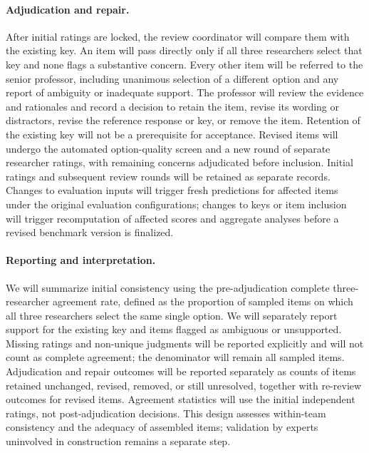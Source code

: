 \documentclass[11pt]{article}
\begin{document}
\paragraph{Adjudication and repair.}
After initial ratings are locked, the review coordinator will compare them with the existing key. An item will pass directly only if all three researchers select that key and none flags a substantive concern. Every other item will be referred to the senior professor, including unanimous selection of a different option and any report of ambiguity or inadequate support. The professor will review the evidence and rationales and record a decision to retain the item, revise its wording or distractors, revise the reference response or key, or remove the item. Retention of the existing key will not be a prerequisite for acceptance. Revised items will undergo the automated option-quality screen and a new round of separate researcher ratings, with remaining concerns adjudicated before inclusion. Initial ratings and subsequent review rounds will be retained as separate records. Changes to evaluation inputs will trigger fresh predictions for affected items under the original evaluation configurations; changes to keys or item inclusion will trigger recomputation of affected scores and aggregate analyses before a revised benchmark version is finalized.

\paragraph{Reporting and interpretation.}
We will summarize initial consistency using the pre-adjudication complete three-researcher agreement rate, defined as the proportion of sampled items on which all three researchers select the same single option. We will separately report support for the existing key and items flagged as ambiguous or unsupported. Missing ratings and non-unique judgments will be reported explicitly and will not count as complete agreement; the denominator will remain all sampled items. Adjudication and repair outcomes will be reported separately as counts of items retained unchanged, revised, removed, or still unresolved, together with re-review outcomes for revised items. Agreement statistics will use the initial independent ratings, not post-adjudication decisions. This design assesses within-team consistency and the adequacy of assembled items; validation by experts uninvolved in construction remains a separate step.

\end{document}

